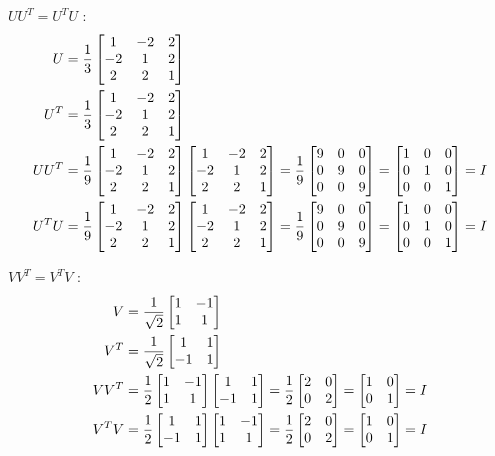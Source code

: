 \documentclass[10pt]{exam}
\begin{document}
\begin{questions}
\begin{parts}
$UU^T = U^TU$ :
\begin{align*}
    U &= \frac13 \begin{bmatrix}1 & -2 & 2 \\ -2 & 1 & 2 \\ 2 & 2 & 1\end{bmatrix}\\
    U^T &= \frac13 \begin{bmatrix}1 & -2 & 2 \\ -2 & 1 & 2 \\ 2 & 2 & 1\end{bmatrix}\\
    UU^T &= \frac{1}{9} \begin{bmatrix}1 & -2 & 2 \\ -2 & 1 & 2 \\ 2 & 2 & 1\end{bmatrix} \begin{bmatrix}1 & -2 & 2 \\ -2 & 1 & 2 \\ 2 & 2 & 1\end{bmatrix} = \frac{1}{9} \begin{bmatrix}9 & 0 & 0 \\ 0 & 9 & 0 \\ 0 & 0 & 9\end{bmatrix} = \begin{bmatrix}1 & 0 & 0 \\ 0 & 1 & 0 \\ 0 & 0 & 1\end{bmatrix} = I\\
    U^TU &= \frac{1}{9} \begin{bmatrix}1 & -2 & 2 \\ -2 & 1 & 2 \\ 2 & 2 & 1\end{bmatrix} \begin{bmatrix}1 & -2 & 2 \\ -2 & 1 & 2 \\ 2 & 2 & 1\end{bmatrix} = \frac{1}{9} \begin{bmatrix}9 & 0 & 0 \\ 0 & 9 & 0 \\ 0 & 0 & 9\end{bmatrix} = \begin{bmatrix}1 & 0 & 0 \\ 0 & 1 & 0 \\ 0 & 0 & 1\end{bmatrix} = I
\end{align*}

$VV^T = V^TV$ :
\begin{align*}
    V &= \frac{1}{\sqrt{2}} \begin{bmatrix}1 & -1 \\ 1 & 1\end{bmatrix}\\
    V^T &= \frac{1}{\sqrt{2}} \begin{bmatrix}1 & 1 \\ -1 & 1\end{bmatrix}\\
    VV^T &= \frac{1}{2} \begin{bmatrix}1 & -1 \\ 1 & 1\end{bmatrix}\begin{bmatrix}1 & 1 \\ -1 & 1\end{bmatrix} = \frac{1}{2} \begin{bmatrix}2 & 0 \\ 0 & 2\end{bmatrix} = \begin{bmatrix}1 & 0 \\ 0 & 1\end{bmatrix} = I\\
    V^TV &= \frac{1}{2} \begin{bmatrix}1 & 1 \\ -1 & 1\end{bmatrix}\begin{bmatrix}1 & -1 \\ 1 & 1\end{bmatrix} = \frac{1}{2} \begin{bmatrix}2 & 0 \\ 0 & 2\end{bmatrix} = \begin{bmatrix}1 & 0 \\ 0 & 1\end{bmatrix} = I
\end{align*}


\end{parts}
\end{questions}
\end{document}
